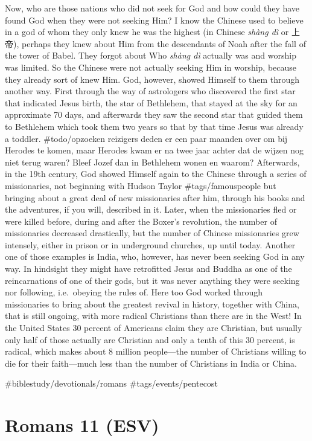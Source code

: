 Now, who are those nations who did not seek for God and how could they
have found God when they were not seeking Him? I know the Chinese used
to believe in a god of whom they only knew he was the highest (in
Chinese \emph{shàng dì} or 上帝), perhaps they knew about Him from the
descendants of Noah after the fall of the tower of Babel. They forgot
about Who \emph{shàng dì} actually was and worship was limited. So the
Chinese were not actually seeking Him in worship, because they already
sort of knew Him. God, however, showed Himself to them through another
way. First through the way of astrologers who discovered the first star
that indicated Jesus birth, the star of Bethlehem, that stayed at the
sky for an approximate 70 days, and afterwards they saw the second star
that guided them to Bethlehem which took them two years so that by that
time Jesus was already a toddler. \#todo/opzoeken reizigers deden er een
paar maanden over om bij Herodes te komen, maar Herodes kwam er na twee
jaar achter dat de wijzen nog niet terug waren? Bleef Jozef dan in
Bethlehem wonen en waarom? Afterwards, in the 19th century, God showed
Himself again to the Chinese through a series of missionaries, not
beginning with Hudson Taylor \#tags/famouspeople but bringing about a
great deal of new missionaries after him, through his books and the
adventures, if you will, described in it. Later, when the missionaries
fled or were killed before, during and after the Boxer's revolution, the
number of missionaries decreased drastically, but the number of Chinese
missionaries grew intensely, either in prison or in underground
churches, up until today. Another one of those examples is India, who,
however, has never been seeking God in any way. In hindsight they might
have retrofitted Jesus and Buddha as one of the reincarnations of one of
their gods, but it was never anything they were seeking nor following,
i.e.~obeying the rules of. Here too God worked through missionaries to
bring about the greatest revival in history, together with China, that
is still ongoing, with more radical Christians than there are in the
West! In the United States 30 percent of Americans claim they are
Christian, but usually only half of those actually are Christian and
only a tenth of this 30 percent, is radical, which makes about 8 million
people---the number of Christians willing to die for their faith---much
less than the number of Christians in India or China.

\#biblestudy/devotionals/romans \#tags/events/pentecost

\hypertarget{romans-11-esv}{%
\section{Romans 11 (ESV)}\label{romans-11-esv}}

